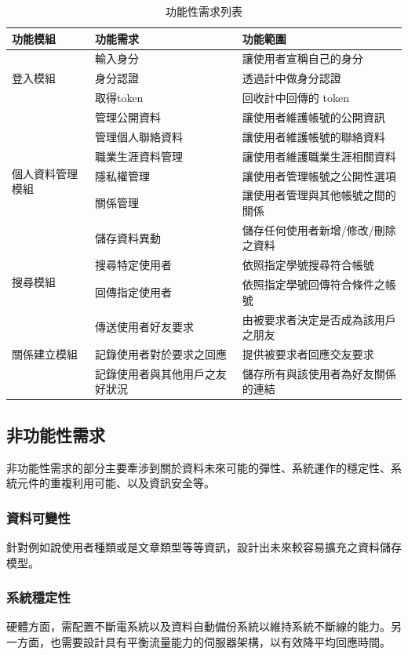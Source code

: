 \documentclass[11pt]{article}
\begin{document}
\begin{table}[t]
\centering
\begin{tabular}{ | l | l | l | }
\hline
功能模組 & 功能需求 & 功能範圍 \\ \hline
\multirow{3}{*}{登入模組} 
& 輸入身分 & 讓使用者宣稱自己的身分\\
& 身分認證 & 透過計中做身分認證 \\
& 取得token & 回收計中回傳的 token \\ \hline
\multirow{6}{*}{個人資料管理模組} 
& 管理公開資料 & 讓使用者維護帳號的公開資訊 \\
& 管理個人聯絡資料& 讓使用者維護帳號的聯絡資料\\
& 職業生涯資料管理& 讓使用者維護職業生涯相關資料 \\
& 隱私權管理& 讓使用者管理帳號之公開性選項 \\
& 關係管理& 讓使用者管理與其他帳號之間的關係 \\
& 儲存資料異動& 儲存任何使用者新增/修改/刪除之資料 \\ \hline
\multirow{2}{*}{搜尋模組} 
& 搜尋特定使用者 & 依照指定學號搜尋符合帳號 \\
& 回傳指定使用者 & 依照指定學號回傳符合條件之帳號 \\ \hline
 \multirow{3}{*}{關係建立模組} 
& 傳送使用者好友要求 & 由被要求者決定是否成為該用戶之朋友 \\ 
& 記錄使用者對於要求之回應 & 提供被要求者回應交友要求 \\
& 記錄使用者與其他用戶之友好狀況 & 儲存所有與該使用者為好友關係的連結 \\ \hline
\end{tabular}
\caption{功能性需求列表}
\label{req}
\end{table}

\subsection{非功能性需求}
非功能性需求的部分主要牽涉到關於資料未來可能的彈性、系統運作的穩定性、系統元件的重複利用可能、以及資訊安全等。
\subsubsection{資料可變性}
針對例如說使用者種類或是文章類型等等資訊，設計出未來較容易擴充之資料儲存模型。
\subsubsection{系統穩定性}
硬體方面，需配置不斷電系統以及資料自動備份系統以維持系統不斷線的能力。另一方面，也需要設計具有平衡流量能力的伺服器架構，以有效降平均回應時間。
\end{document}
